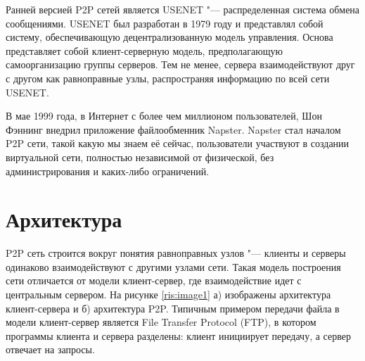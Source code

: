 \documentclass[bachelor, och, coursework]{SCWorks}
\begin{document}
Ранней версией P2P сетей является USENET "--- распределенная система обмена сообщениями. USENET был разработан в 1979 году и представлял собой систему, обеспечивающую децентрализованную модель управления. Основа представляет собой клиент-серверную модель, предполагающую самоорганизацию группы серверов. Тем не менее, сервера взаимодействуют друг с другом как равноправные узлы, распространяя информацию по всей сети USENET.

В мае 1999 года, в Интернет с более чем миллионом пользователей, Шон Фэннинг внедрил приложение файлообменник Napster. Napster стал началом P2P сети, такой какую мы знаем её сейчас, пользователи участвуют в создании виртуальной сети, полностью независимой от физической, без администрирования и каких-либо ограничений.

\section{Архитектура}
P2P сеть строится вокруг понятия равноправных узлов "--- клиенты и серверы одинаково взаимодействуют с другими узлами сети. Такая модель построения сети отличается от модели клиент-сервер, где взаимодействие идет с центральным сервером. 
На рисунке \ref{ris:image1} а) изображены архитектура клиент-сервера и б) архитектура P2P. Типичным примером передачи файла в модели клиент-сервер является File Transfer Protocol (FTP), в котором программы клиента и сервера разделены: клиент инициирует передачу, а сервер отвечает на запросы. 
\end{document}
